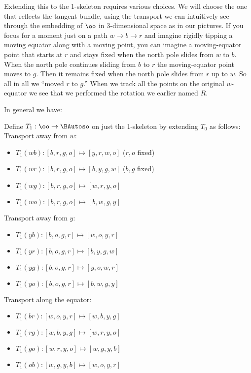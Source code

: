 Extending this to the 1-skeleton requires various choices. We will
choose the one that reflects the tangent bundle, using the transport we
can intuitively see through the embedding of \(\oo\) in 3-dimensional
space as in our pictures. If you focus for a moment just on a path
\(w\to b\to r\) and imagine rigidly tipping a moving equator along with
a moving point, you can imagine a moving-equator point that starts at
\(r\) and stays fixed when the north pole slides from \(w\) to \(b\).
When the north pole continues sliding from \(b\) to \(r\) the
moving-equator point moves to \(g\). Then it remains fixed when the
north pole slides from \(r\) up to \(w\). So all in all we ``moved \(r\)
to \(g\).'' When we track all the points on the original \(w\)-equator
we see that we performed the rotation we earlier named \(R\).

In general we have:

\begin{mydef}
Define \( T_1:\oo\to\BAutoso \) on just the 1-skeleton by extending \( T_0 \) as follows:
Transport away from \( w \):
\begin{itemize}
\item \( T_1(wb):[b, r, g, o]\mapsto [y, r, w, o] \) (\( r, o \) fixed)
\item \( T_1(wr):[b, r, g, o]\mapsto [b, y, g, w] \) (\( b, g \) fixed)
\item \( T_1(wg):[b, r, g, o]\mapsto [w, r, y, o] \)
\item \( T_1(wo):[b, r, g, o]\mapsto [b, w, g, y] \)
\end{itemize}
Transport away from \( y \):
\begin{itemize}
\item \( T_1(yb):[b, o, g, r]\mapsto [w, o, y, r] \)
\item \( T_1(yr):[b, o, g, r]\mapsto [b, y, g, w] \)
\item \( T_1(yg):[b, o, g, r]\mapsto [y, o, w, r] \)
\item \( T_1(yo):[b, o, g, r]\mapsto [b, w, g, y] \)
\end{itemize}
Transport along the equator:
\begin{itemize}
\item \( T_1(br):[w, o, y, r]\mapsto [w, b, y, g] \) 
\item \( T_1(rg):[w, b, y, g]\mapsto [w, r, y, o] \)
\item \( T_1(go):[w, r, y, o]\mapsto [w, g, y, b] \)
\item \( T_1(ob):[w, g, y, b]\mapsto [w, o, y, r] \)
\end{itemize}
\end{mydef}

